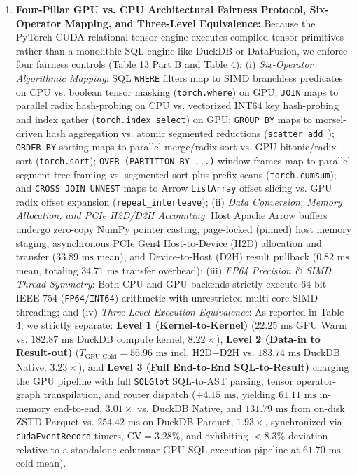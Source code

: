 \documentclass[10pt,a4paper]{article}
\begin{document}
\begin{enumerate}[leftmargin=1.5em,itemsep=2pt]
execution complexity---including distributed cloud slot compute time on BigQuery ($\rho = 0.5124, p = 2.41\times 10^{-6}$), Apache DataFusion CPU latency ($\rho = 0.3839, p = 0.0007$), and Polars latency ($\rho = 0.3137, p = 0.0061$)---and on the external 22-query TPC-H suite (Q1--Q22) exhibits strong alignment with AST node complexity ($\rho = 0.8418, p = 9.12\times 10^{-7}$) and a partial correlation of $\rho_{\text{partial}} = 0.5840$ ($p = 0.0054$) with join/subquery execution work controlling for scanned table volume.
    \item \textbf{Four-Pillar GPU vs. CPU Architectural Fairness Protocol, Six-Operator Mapping, and Three-Level Equivalence:} Because the PyTorch CUDA relational tensor engine executes compiled tensor primitives rather than a monolithic SQL engine like DuckDB or DataFusion, we enforce four fairness controls (Table 13 Part B and Table 4): (i) \emph{Six-Operator Algorithmic Mapping}: SQL \texttt{WHERE} filters map to SIMD branchless predicates on CPU vs. boolean tensor masking (\texttt{torch.where}) on GPU; \texttt{JOIN} maps to parallel radix hash-probing on CPU vs. vectorized INT64 key hash-probing and index gather (\texttt{torch.index\_select}) on GPU; \texttt{GROUP BY} maps to morsel-driven hash aggregation vs. atomic segmented reductions (\texttt{scatter\_add\_}); \texttt{ORDER BY} sorting maps to parallel merge/radix sort vs. GPU bitonic/radix sort (\texttt{torch.sort}); \texttt{OVER (PARTITION BY ...)} window frames map to parallel segment-tree framing vs. segmented sort plus prefix scans (\texttt{torch.cumsum}); and \texttt{CROSS JOIN UNNEST} maps to Arrow \texttt{ListArray} offset slicing vs. GPU radix offset expansion (\texttt{repeat\_interleave}); (ii) \emph{Data Conversion, Memory Allocation, and PCIe H2D/D2H Accounting}: Host Apache Arrow buffers undergo zero-copy NumPy pointer casting, page-locked (pinned) host memory staging, asynchronous PCIe Gen4 Host-to-Device (H2D) allocation and transfer ($33.89\text{ ms}$ mean), and Device-to-Host (D2H) result pullback ($0.82\text{ ms}$ mean, totaling $34.71\text{ ms}$ transfer overhead); (iii) \emph{FP64 Precision \& SIMD Thread Symmetry}: Both CPU and GPU backends strictly execute 64-bit IEEE 754 (\texttt{FP64}/\texttt{INT64}) arithmetic with unrestricted multi-core SIMD threading; and (iv) \emph{Three-Level Execution Equivalence}: As reported in Table 4, we strictly separate: \textbf{Level 1 (Kernel-to-Kernel)} ($22.25\text{ ms}$ GPU Warm vs. $182.87\text{ ms}$ DuckDB compute kernel, $8.22\times$), \textbf{Level 2 (Data-in to Result-out)} ($T_{\text{GPU\_Cold}} = 56.96\text{ ms}$ incl. H2D+D2H vs. $183.74\text{ ms}$ DuckDB Native, $3.23\times$), and \textbf{Level 3 (Full End-to-End SQL-to-Result)} charging the GPU pipeline with full \texttt{SQLGlot} SQL-to-AST parsing, tensor operator-graph transpilation, and router dispatch ($+4.15\text{ ms}$, yielding $61.11\text{ ms}$ in-memory end-to-end, $3.01\times$ vs. DuckDB Native, and $131.79\text{ ms}$ from on-disk ZSTD Parquet vs. $254.42\text{ ms}$ on DuckDB Parquet, $1.93\times$, synchronized via \texttt{cudaEventRecord} timers, $\text{CV}=3.28\%$, and exhibiting $<8.3\%$ deviation relative to a standalone columnar GPU SQL execution pipeline at $61.70\text{ ms}$ cold mean). 

\end{enumerate}
\end{document}
